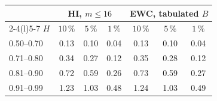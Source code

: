 \begin{tabular}{@{}lcccccc@{}}\toprule
 & \multicolumn{3}{c}{HI, $m\le16$} & \multicolumn{3}{c}{EWC, tabulated $B$}\\
\cmidrule(lr){2-4}\cmidrule(l){5-7}
$H$ & $10\,\%$ & $5\,\%$ & $1\,\%$ & $10\,\%$ & $5\,\%$ & $1\,\%$\\\midrule
0.50--0.70 & 0.13 & 0.10 & 0.04 & 0.13 & 0.10 & 0.04\\
0.71--0.80 & 0.34 & 0.27 & 0.12 & 0.35 & 0.28 & 0.12\\
0.81--0.90 & 0.72 & 0.59 & 0.26 & 0.73 & 0.59 & 0.27\\
0.91--0.99 & 1.23 & 1.03 & 0.48 & 1.24 & 1.03 & 0.49\\
\bottomrule\end{tabular}
